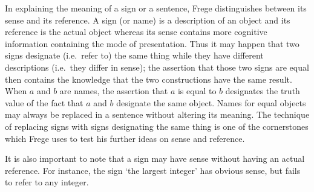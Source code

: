 \documentclass{article}
\begin{document}
\maketitle

In explaining the meaning of a sign or a sentence, Frege distinguishes between its sense and its reference. A sign (or name) is a description of an object and its reference is the actual object whereas its sense contains more cognitive information containing the mode of presentation. Thus it may happen that two signs designate (i.e.~refer to) the same thing while they have different descriptions (i.e.~they differ in sense); the assertion that those two signs are equal then contains the knowledge that the two constructions have the same result. When $a$ and $b$ are names, the assertion that $a$ is equal to $b$ designates the truth value of the fact that $a$ and $b$ designate the same object. Names for equal objects may always be replaced in a sentence without altering its meaning. The technique of replacing signs with signs designating the same thing is one of the cornerstones which Frege uses to test his further ideas on sense and reference. 

It is also important to note that a sign may have sense without having an actual reference. For instance, the sign `the largest integer' has obvious sense, but fails to refer to any integer.
\end{document}
